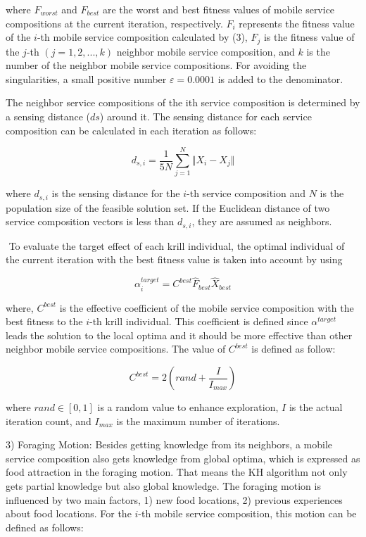 \documentclass[10pt,journal,compsoc]{IEEEtran}
\begin{document}
where $F_{worst}$ and $F_{best}$ are the worst and best fitness values of mobile service compositions at the current iteration, respectively. $F_i$ represents the fitness value of the $i$-th mobile service composition calculated by (3), $F_j$ is the fitness value of the $j$-th $(j = 1,2,...,k)$ neighbor mobile service composition, and $k$ is the number of the neighbor mobile service compositions. For avoiding the singularities, a small positive number $\varepsilon = 0.0001$ is added to the denominator.

The neighbor service compositions of the ith service composition is determined by a sensing distance ($ds$) around it. The sensing distance for each service composition can be calculated in each iteration as follows:

\begin{equation}
d_{s,i} = \frac{1}{5N}\sum_{j=1}^{N}\Vert X_i-X_j \Vert
\end{equation}

where $d_{s,i}$ is the sensing distance for the $i$-th service composition and $N$ is the population size of the feasible solution set. If the Euclidean distance of two service composition vectors is less than $d_{s,i}$, they are assumed as neighbors.

​	To evaluate the target effect of each krill individual, the optimal individual of the current iteration with the best fitness value is taken into account by using

\begin{equation}
\alpha^{target}_{i} = C^{best}\hat{F}_{best}\hat{X}_{best}
\end{equation}

where, $C^{best}$ is the effective coefficient of the mobile service composition with the best fitness to the $i$-th krill individual. This coefficient is defined since $\alpha^{target}$ leads the solution to the local optima and it should be more effective than other neighbor mobile service compositions. The value of $C^{best}$ is defined as follow:

\begin{equation}
C^{best} = 2(rand+\frac{I}{I_{max}})
\end{equation}

where $rand \in [0, 1]$ is a random value to enhance exploration, $I$ is the actual iteration count, and $I_{max}$ is the maximum number of iterations.

3) Foraging Motion: Besides getting knowledge from its neighbors, a mobile service composition also gets knowledge from global optima, which is expressed as food attraction in the foraging motion. That means the KH algorithm not only gets partial knowledge but also global knowledge. The foraging motion is influenced by two main factors, 1) new food locations, 2) previous experiences about food locations. For the $i$-th mobile service composition, this motion can be defined as follows:
\end{document}
